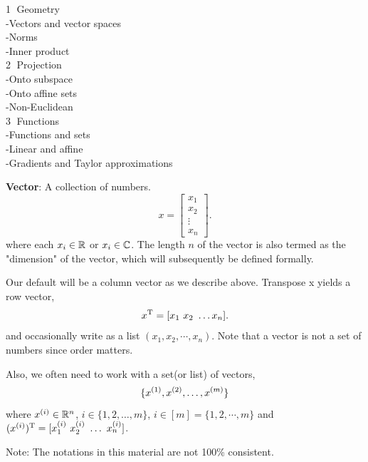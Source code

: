 
\noindent\textcircled{1} Geometry\\
-Vectors and vector spaces\\
-Norms\\
-Inner product\\

\noindent\textcircled{2} Projection\\
-Onto subspace\\
-Onto affine sets\\
-Non-Euclidean\\

\noindent\textcircled{3} Functions\\
-Functions and sets\\
-Linear and affine\\
-Gradients and Taylor approximations\\

\newpage

\noindent\textbf{Vector}: A collection of numbers.
\begin{equation*}
x = \left[ \begin{array}{c} x_1 \\ x_2 \\ \vdots \\ x_n\end{array} \right].
\end{equation*}
where each $x_i \in \mathbb{R}$ or $x_i \in \mathbb{C}$. The length $n$ of the vector is also termed as the "dimension" of the vector, which will subsequently be defined formally.

Our default will be a column vector as we describe above. Transpose x yields a row vector,   
\begin{equation*}
x^{\rm T} = [ x_1 \ x_2 \ \ldots x_n].
\end{equation*}
and occasionally write as a list $(x_{1}, x_{2},\cdots,x_{n})$.  Note that a vector is not a set of numbers since order matters.

Also, we often need to work with a set(or list) of vectors,
\begin{equation*}
\{ x^{(1)}_{}, x^{(2)}_{}, \ldots, x^{(m)}_{}\}
\end{equation*}
where $x^{(i)}_{} \in \mathbb{R}^n$, $i \in \{1, 2, \ldots, m\}$, $i \in [m] = \{1,2,\cdots,m\}$ and
$(\vecx{i})^\trans = [ \vecx[1]{i} \ \vecx[2]{i} \ \ldots \ \vecx[n]{i} ]$.  

Note: The notations in this material are not 100\% consistent.

